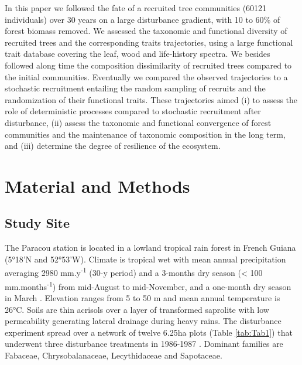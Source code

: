 \documentclass[fleqn,10pt]{ArtEcoFoG} %
\begin{document}
In this paper we followed the fate of a recruited tree communities
(60121 individuals) over 30 years on a large disturbance gradient, with
10 to 60\% of forest biomass removed. We assessed the taxonomic and
functional diversity of recruited trees and the corresponding traits
trajectories, using a large functional trait database covering the leaf,
wood and life-history spectra. We besides followed along time the
composition dissimilarity of recruited trees compared to the initial
communities. Eventually we compared the observed trajectories to a
stochastic recruitment entailing the random sampling of recruits and the
randomization of their functional traits. These trajectories aimed (i)
to assess the role of deterministic processes compared to stochastic
recruitment after disturbance, (ii) assess the taxonomic and functional
convergence of forest communities and the maintenance of taxonomic
composition in the long term, and (iii) determine the degree of
resilience of the ecosystem.

\section{Material and Methods}\label{material-and-methods}

\subsection{Study Site}\label{study-site}

The Paracou station is located in a lowland tropical rain forest in
French Guiana (5°18'N and 52°53'W). Climate is tropical wet with mean
annual precipitation averaging 2980 mm.y\textsuperscript{-1} (30-y
period) and a 3-months dry season (\textless{} 100
mm.months\textsuperscript{-1}) from mid-August to mid-November, and a
one-month dry season in March \citep{Wagner2011}. Elevation ranges from
5 to 50 m and mean annual temperature is 26°C. Soils are thin acrisols
over a layer of transformed saprolite with low permeability generating
lateral drainage during heavy rains. The disturbance experiment spread
over a network of twelve 6.25ha plots (Table \ref{tab:Tab1}) that
underwent three disturbance treatments in 1986-1987 \citep{Herault2018}.
Dominant families are Fabaceae, Chrysobalanaceae, Lecythidaceae and
Sapotaceae.
\end{document}
